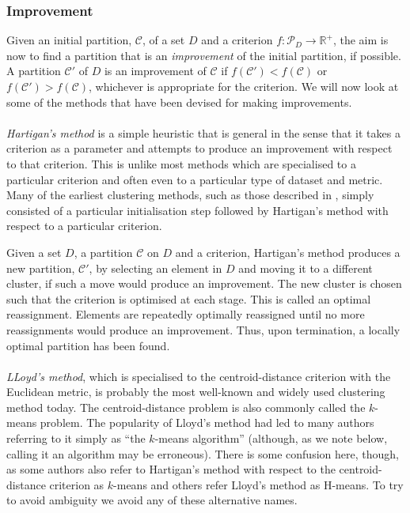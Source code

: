 \documentclass[a4paper]{report}
\newcommand{\dset}{D}
\newcommand{\clus}{\mathcal{C}}
\newcommand{\parts}{\mathcal{P}}
\begin{document}
\subsubsection{Improvement}
\label{sec:improvement}

Given an initial partition, $\clus$, of a set $\dset$ and a criterion $f
\colon \parts_{\dset} \to \mathbb{R}^+$, the aim is now to find a partition
that is an \textit{improvement} of the initial partition, if possible.  A
partition $\clus'$ of $\dset$ is an improvement of $\clus$ if $f(\clus') <
f(\clus)$ or $f(\clus') > f(\clus)$, whichever is appropriate for the
criterion.  We will now look at some of the methods that have been devised for
making improvements.
\\\\
\noindent \textit{Hartigan's method} \citep{hartigan1975clustering} is a
simple heuristic that is general in the sense that it takes a criterion as a
parameter and attempts to produce an improvement with respect to that
criterion.  This is unlike most methods which are specialised to a particular
criterion and often even to a particular type of dataset and metric.  Many of
the earliest clustering methods, such as those described in \citep{everitt80},
simply consisted of a particular initialisation step followed by Hartigan's
method with respect to a particular criterion.

Given a set $\dset$, a partition $\clus$ on $\dset$ and a criterion,
Hartigan's method produces a new partition, $\clus'$, by selecting an element
in $\dset$ and moving it to a different cluster, if such a move would produce
an improvement.  The new cluster is chosen such that the criterion is
optimised at each stage.  This is called an optimal reassignment.  Elements
are repeatedly optimally reassigned until no more reassignments would produce
an improvement.  Thus, upon termination, a locally optimal partition has been
found.
\\\\
\noindent \textit{LLoyd's method}, which is specialised to the
centroid-distance criterion with the Euclidean metric, is probably the most
well-known and widely used clustering method today.  The centroid-distance
problem is also commonly called the $k$-means problem.  The popularity of
Lloyd's method had led to many authors referring to it simply as ``the
$k$-means algorithm'' (although, as we note below, calling it an algorithm may
be erroneous).  There is some confusion here, though, as some authors also
refer to Hartigan's method with respect to the centroid-distance criterion as
$k$-means and others refer Lloyd's method as H-means.  To try to avoid
ambiguity we avoid any of these alternative names.
\end{document}
